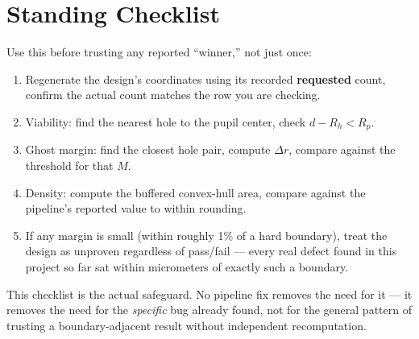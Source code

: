 \section{Standing Checklist}

Use this before trusting any reported ``winner,'' not just once:

\begin{enumerate}
  \item Regenerate the design's coordinates using its recorded
  \textbf{requested} count, confirm the actual count matches the row you
  are checking.
  \item Viability: find the nearest hole to the pupil center, check
  $d - R_h < R_p$.
  \item Ghost margin: find the closest hole pair, compute $\Delta r$,
  compare against the threshold for that $M$.
  \item Density: compute the buffered convex-hull area, compare against
  the pipeline's reported value to within rounding.
  \item If any margin is small (within roughly 1\% of a hard boundary),
  treat the design as unproven regardless of pass/fail --- every real
  defect found in this project so far sat within micrometers of exactly
  such a boundary.
\end{enumerate}

This checklist is the actual safeguard. No pipeline fix removes the need
for it --- it removes the need for the \emph{specific} bug already found,
not for the general pattern of trusting a boundary-adjacent result without
independent recomputation.


